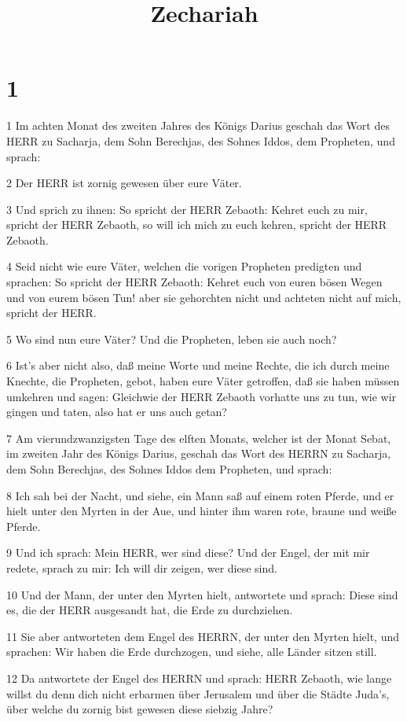 

\title{Zechariah}


\chapter{1}

\par 1 Im achten Monat des zweiten Jahres des Königs Darius geschah das Wort des HERR zu Sacharja, dem Sohn Berechjas, des Sohnes Iddos, dem Propheten, und sprach:
\par 2 Der HERR ist zornig gewesen über eure Väter.
\par 3 Und sprich zu ihnen: So spricht der HERR Zebaoth: Kehret euch zu mir, spricht der HERR Zebaoth, so will ich mich zu euch kehren, spricht der HERR Zebaoth.
\par 4 Seid nicht wie eure Väter, welchen die vorigen Propheten predigten und sprachen: So spricht der HERR Zebaoth: Kehret euch von euren bösen Wegen und von eurem bösen Tun! aber sie gehorchten nicht und achteten nicht auf mich, spricht der HERR.
\par 5 Wo sind nun eure Väter? Und die Propheten, leben sie auch noch?
\par 6 Ist's aber nicht also, daß meine Worte und meine Rechte, die ich durch meine Knechte, die Propheten, gebot, haben eure Väter getroffen, daß sie haben müssen umkehren und sagen: Gleichwie der HERR Zebaoth vorhatte uns zu tun, wie wir gingen und taten, also hat er uns auch getan?
\par 7 Am vierundzwanzigsten Tage des elften Monats, welcher ist der Monat Sebat, im zweiten Jahr des Königs Darius, geschah das Wort des HERRN zu Sacharja, dem Sohn Berechjas, des Sohnes Iddos dem Propheten, und sprach:
\par 8 Ich sah bei der Nacht, und siehe, ein Mann saß auf einem roten Pferde, und er hielt unter den Myrten in der Aue, und hinter ihm waren rote, braune und weiße Pferde.
\par 9 Und ich sprach: Mein HERR, wer sind diese? Und der Engel, der mit mir redete, sprach zu mir: Ich will dir zeigen, wer diese sind.
\par 10 Und der Mann, der unter den Myrten hielt, antwortete und sprach: Diese sind es, die der HERR ausgesandt hat, die Erde zu durchziehen.
\par 11 Sie aber antworteten dem Engel des HERRN, der unter den Myrten hielt, und sprachen: Wir haben die Erde durchzogen, und siehe, alle Länder sitzen still.
\par 12 Da antwortete der Engel des HERRN und sprach: HERR Zebaoth, wie lange willst du denn dich nicht erbarmen über Jerusalem und über die Städte Juda's, über welche du zornig bist gewesen diese siebzig Jahre?

